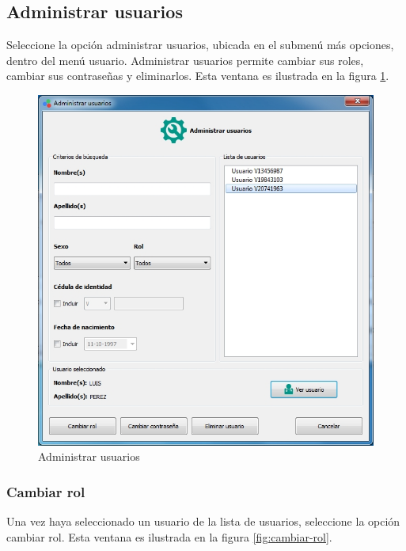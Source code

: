 	\subsection*{Administrar usuarios}
	
	Seleccione la opci\'{o}n administrar usuarios, ubicada en el submen\'{u} m\'{a}s opciones, dentro del men\'{u} usuario. Administrar usuarios permite cambiar sus roles, cambiar sus contrase\~{n}as y eliminarlos. Esta ventana es ilustrada en la figura \ref{fig:administrar-usuarios}.
	
\begin{figure}[H]
  \centering
  \includegraphics[width=1\linewidth]{./img/administrar-usuarios.jpg}
\caption[]{Administrar usuarios\label{fig:administrar-usuarios}}
\end{figure}
	
		\subsubsection*{Cambiar rol}
		
		Una vez haya seleccionado un usuario de la lista de usuarios, seleccione la opci\'{o}n cambiar rol. Esta ventana es ilustrada en la figura \ref{fig:cambiar-rol}.
		
